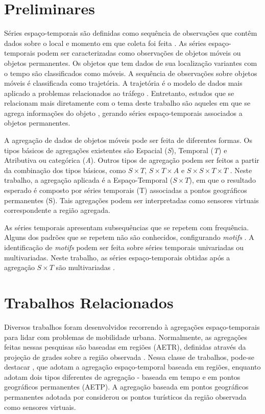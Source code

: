 \documentclass[12pt]{report} %
\begin{document}
\chapter{Preliminares}
\label{sec:background}
Séries espaço-temporais são definidas como sequência de observações que contêm dados sobre o local e momento em que coleta foi feita \citep{cressie2015statistics}. As séries espaço-temporais podem ser caracterizadas como observações de objetos móveis ou objetos permanentes. Os objetos que tem dados de sua localização variantes com o tempo são classificados como móveis. A sequência de observações sobre objetos móveis é classificada como trajetória. A trajetória é o modelo de dados mais aplicado a problemas relacionados ao tráfego \citep{chen2015survey}. Entretanto, estudos que se relacionam mais diretamente com o tema deste trabalho são aqueles em que se agrega informações do objeto \citep{tao2004spatio}, gerando séries espaço-temporais associados a objetos permanentes.

A agregação de dados de objetos móveis pode ser feita de diferentes formas. Os tipos básicos de agregações existentes são Espacial (\emph{S}), Temporal (\emph{T}) e Atributiva ou categórica (\emph{A}). Outros tipos de agregação podem ser feitos a partir da combinação dos tipos básicos, como \emph{$S \times T$}, \emph{$S \times T \times A$} e \emph{$S \times S \times T \times T$} \citep{chen2015survey}. Neste trabalho, a agregação aplicada é a Espaço-Temporal (\emph{$S \times T$}), em que o resultado esperado é composto por séries temporais (T) associadas a pontos geográficos permanentes (S). Tais agregações podem ser interpretadas como sensores virtuais correspondente a região agregada.  

As séries temporais apresentam subsequências que se repetem com frequência. Alguns dos padrões que se repetem não são conhecidos, configurando \emph{motifs} \citep{esling2012time}. A identificação de \emph{motifs} podem ser feita sobre séries temporais univariadas ou multivariadas. Neste trabalho, as séries espaço-temporais obtidas após a agregação \emph{$S \times T$} são multivariadas \citep{wang2016effective} \citep{vahdatpour2009toward}. 


\chapter{Trabalhos Relacionados}
\label{sec:trabalhos_relacionados}
Diversos trabalhos foram desenvolvidos recorrendo à agregações espaço-temporais para lidar com problemas de mobilidade urbana. Normalmente, as agregações feitas nessas pesquisas são baseadas em regiões (AETR), definidas através da projeção de grades sobre a região observada \citep{ferreira2013visual, andrienko2008spatio, adrienko2011spatial,ferreira2013visual}. Nessa classe de trabalhos, pode-se destacar \citet{andrienko2008spatio}, que adotam a agregação espaço-temporal baseada em regiões, enquanto \citet{adrienko2011spatial} adotam dois tipos diferentes de agregação - baseada em tempo e em pontos geográficos permanentes (AETP). A agregação baseada em pontos geográficos permanentes adotada por \citet{adrienko2011spatial} considerou os pontos turísticos da região observada como sensores virtuais.
\end{document}
